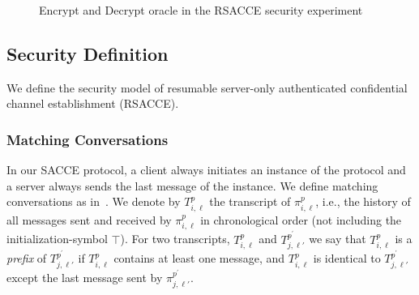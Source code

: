 \begin{figure*}[!htb]
\begin{center}
\caption{Encrypt and Decrypt oracle in the RSACCE security experiment}
 \label{fig:LHAE_rsacce}
\end{center}
\end{figure*}

\subsection{Security Definition} \label{sec:sec_def}

We define the security model of resumable server-only
authenticated confidential channel establishment (RSACCE).

\subsubsection{Matching Conversations}
In our SACCE protocol, a client always initiates an
instance of the protocol and a server always sends the
last message of the instance.
We define matching conversations as in~\cite{JKSS12:ACCE}.
We denote by $T^p_{i,\ell}$ the transcript of
$\pi^p_{i,\ell}$, i.e., the history of all messages sent
and received by $\pi^p_{i,\ell}$ in chronological order
(not including the initialization-symbol $\top$).
For two transcripts, $T^p_{i,\ell}$ and
$T^{p^{\prime}}_{j,\ell'}$ we say that $T^p_{i,\ell}$
is a \textit{prefix} of $T^{p^{\prime}}_{j,\ell'}$ if
$T^p_{i,\ell}$ contains at least one message, and
$T^p_{i,\ell}$ is identical to
$T^{p^{\prime}}_{j,\ell'}$ except the last message sent
by $\pi^{p^{\prime}}_{j,\ell'}$.

